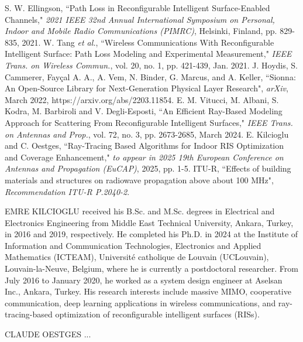 \documentclass{IEEEoj}
\begin{document}
\begin{thebibliography}{00}
	 S. W. Ellingson, “Path Loss in Reconfigurable Intelligent Surface-Enabled Channels," \textit{2021 IEEE 32nd Annual International Symposium on Personal, Indoor and Mobile Radio Communications (PIMRC)}, Helsinki, Finland, pp. 829-835, 2021.
	 W. Tang \textit{et al.}, “Wireless Communications With Reconfigurable Intelligent Surface: Path Loss Modeling and Experimental Measurement," \textit{IEEE Trans. on Wireless Commun.}, vol. 20, no. 1, pp. 421-439, Jan. 2021.
	 J. Hoydis, S. Cammerer, Fayçal {A. A.}, A. Vem, N. Binder, G. Marcus, and A. Keller, “Sionna: An Open-Source Library for Next-Generation Physical Layer Research", \textit{arXiv}, March 2022, https://arxiv.org/abs/2203.11854.
	 E. M. Vitucci, M. Albani, S. Kodra, M. Barbiroli and V. Degli-Esposti, “An Efficient Ray-Based Modeling Approach for Scattering From Reconfigurable Intelligent Surfaces," \textit{IEEE Trans. on Antennas and Prop.}, vol. 72, no. 3, pp. 2673-2685, March 2024.
	 E. Kilcioglu and C. Oestges, “Ray-Tracing Based Algorithms for Indoor RIS Optimization and Coverage Enhancement," \textit{to appear in 2025 19th European Conference on Antennas and Propagation (EuCAP)}, 2025, pp. 1-5.
	 ITU-R, “Effects of building materials and structures on radiowave propagation above about 100 MHz", \textit{Recommendation ITU-R P.2040-2}. 
\end{thebibliography}


\begin{IEEEbiography}{EMRE KILCIOGLU } received his B.Sc. and M.Sc. degrees in Electrical and Electronics Engineering from Middle East Technical University, Ankara, Turkey, in 2016 and 2019, respectively. He completed his Ph.D. in 2024 at the Institute of Information and Communication Technologies, Electronics and Applied Mathematics (ICTEAM), Université catholique de Louvain (UCLouvain), Louvain-la-Neuve, Belgium, where he is currently a postdoctoral researcher. From July 2016 to January 2020, he worked as a system design engineer at Aselsan Inc., Ankara, Turkey. His research interests include massive MIMO, cooperative communication, deep learning applications in wireless communications, and ray-tracing-based optimization of reconfigurable intelligent surfaces (RISs).
\end{IEEEbiography}

\begin{IEEEbiography}{CLAUDE OESTGES } ...
\end{IEEEbiography}
\end{document}
